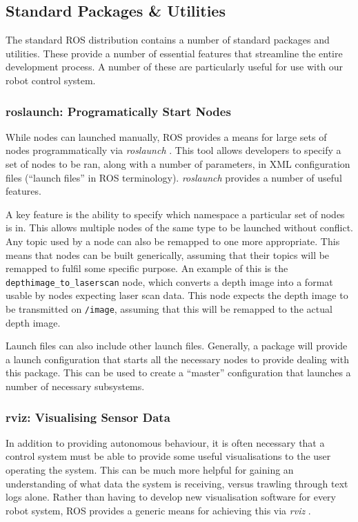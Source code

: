 \subsection{Standard Packages \& Utilities}
The standard ROS distribution contains a number of standard packages and utilities. These provide a number of essential features that streamline the entire development process. A number of these are particularly useful for use with our robot control system.

\subsubsection{roslaunch: Programatically Start Nodes}
While nodes can launched manually, ROS provides a means for large sets of nodes programmatically via \emph{roslaunch} \cite{ros_paper, ros_wiki_roslaunch}. This tool allows developers to specify a set of nodes to be ran, along with a number of parameters, in XML configuration files (``launch files'' in ROS terminology). \emph{roslaunch} provides a number of useful features.

A key feature is the ability to specify which namespace a particular set of nodes is in. This allows multiple nodes of the same type to be launched without conflict. Any topic used by a node can also be remapped to one more appropriate. This means that nodes can be built generically, assuming that their topics will be remapped to fulfil some specific purpose. An example of this is the \texttt{depthimage\_to\_laserscan} node, which converts a depth image into a format usable by nodes expecting laser scan data. This node expects the depth image to be transmitted on \texttt{/image}, assuming that this will be remapped to the actual depth image.

Launch files can also include other launch files. Generally, a package will provide a launch configuration that starts all the necessary nodes to provide dealing with this package. This can be used to create a ``master'' configuration that launches a number of necessary subsystems.

\subsubsection{rviz: Visualising Sensor Data}

In addition to providing autonomous behaviour, it is often necessary that a control system must be able to provide some useful visualisations to the user operating the system. This can be much more helpful for gaining an understanding of what data the system is receiving, versus trawling through text logs alone. Rather than having to develop new visualisation software for every robot system, ROS provides a generic means for achieving this via \emph{rviz} \cite{ros_wiki_rviz}.

